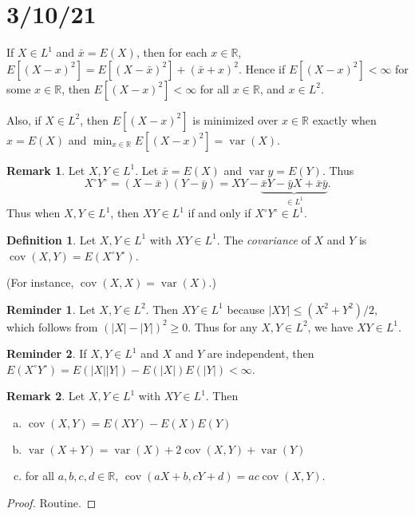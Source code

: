\documentclass{article}
\newcommand{\R}{\mathbb{R}}
\DeclareMathOperator{\var}{var}
\DeclareMathOperator{\cov}{cov}
\theoremstyle{definition}
\newtheorem*{reminder}{Reminder}
\newtheorem*{definition}{Definition}
\newtheorem*{remark}{Remark}
\begin{document}
\section*{3/10/21}

If $X \in L^1$ and $\bar{x} = E(X)$, then for each $x \in \R$, $E[(X-x)^2] = E[(X-\bar{x})^2] + (\bar{x} + x)^2$. Hence if $E[(X-x)^2] < \infty$ for some $x \in \R$, then $E[(X-x)^2] < \infty$ for all $x \in \R$, and $x \in L^2$.

Also, if $X \in L^2$, then $E[(X-x)^2]$ is minimized over $x \in \R$ exactly when $x = E(X)$ and $\min_{x \in \R} E[(X-x)^2] = \var(X)$.

\begin{remark}
     Let $X, Y \in L^1$. Let $\bar{x} = E(X)$ and $\var{y} = E(Y)$. Thus
     \[
        X^\circ Y^\circ = (X-\bar{x})(Y-\bar{y}) = XY-\underbrace{\bar{x}Y-\bar{y}X+\bar{x}\bar{y}}_{\in L^1}.
    \]
    Thus when $X, Y \in L^1$, then $XY \in L^1$ if and only if $X^\circ Y^\circ \in L^1$.
\end{remark}

\begin{definition}
    Let $X,Y \in L^1$ with $XY \in L^1$. The \emph{covariance} of $X$ and $Y$ is $\cov(X,Y) = E(X^\circ Y^\circ)$.
    
    (For instance, $\cov(X, X) = \var(X)$.)
\end{definition}

\begin{reminder}
Let $X, Y \in L^2$. Then $XY \in L^1$ because $|XY| \leq (X^2+Y^2)/2$, which follows from $(|X|-|Y|)^2 \geq 0$. Thus for any $X, Y \in L^2$, we have $XY \in L^1$.
\end{reminder}

\begin{reminder}
If $X, Y \in L^1$ and $X$ and $Y$ are independent, then $E(X^\circ Y^\circ) = E(|X||Y|) - E(|X|)E(|Y|) < \infty$.
\end{reminder}

\begin{remark}
     Let $X, Y \in L^1$ with $XY \in L^1$. Then
     \begin{enumerate}[(a)]
         \item $\cov(X,Y) = E(XY)-E(X)E(Y)$
         \item $\var(X+Y) = \var(X) + 2\cov(X,Y) + \var(Y)$
         \item for all $a, b, c, d \in \R$, $\cov(aX + b, cY + d) = ac\cov(X,Y)$.
     \end{enumerate}
\end{remark}
\begin{proof}
    Routine.
\end{proof}
\end{document}

